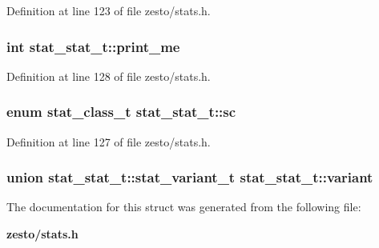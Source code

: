 Definition at line 123 of file zesto/stats.h.
\subsubsection[{print\_\-me}]{\setlength{\rightskip}{0pt plus 5cm}int {\bf stat\_\-stat\_\-t::print\_\-me}}\label{structstat__stat__t_9f0a547ad6eacd4d8192c026eb61753c}




Definition at line 128 of file zesto/stats.h.
\subsubsection[{sc}]{\setlength{\rightskip}{0pt plus 5cm}enum {\bf stat\_\-class\_\-t} {\bf stat\_\-stat\_\-t::sc}}\label{structstat__stat__t_0bc6f92d0330183b00c273b917c83a21}




Definition at line 127 of file zesto/stats.h.
\subsubsection[{variant}]{\setlength{\rightskip}{0pt plus 5cm}union {\bf stat\_\-stat\_\-t::stat\_\-variant\_\-t}  {\bf stat\_\-stat\_\-t::variant}}\label{structstat__stat__t_f97c4cea4ea2372a78b0ae1f94db25ac}




The documentation for this struct was generated from the following file:\begin{CompactItemize}
\item 
{\bf zesto/stats.h}\end{CompactItemize}
